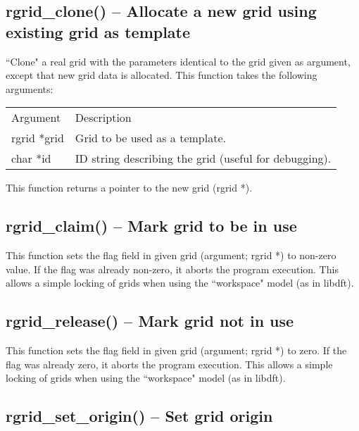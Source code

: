 \documentclass[12pt,letterpaper]{report}
\begin{document}
\subsection{rgrid\_clone() -- Allocate a new grid using existing grid as template}

``Clone" a real grid with the parameters identical to the grid given as argument, except that new grid data is allocated. This function takes the following arguments:
\begin{longtable}{p{} p{}}
Argument & Description\\
\cline{1-2}
rgrid *grid & Grid to be used as a template.\\
char *id & ID string describing the grid (useful for debugging).\\
\end{longtable}
\noindent
This function returns a pointer to the new grid (rgrid *).

\subsection{rgrid\_claim() -- Mark grid to be in use}

This function sets the flag field in given grid (argument; rgrid *) to non-zero value. If the flag was already non-zero, it aborts the program execution. This allows a simple locking of grids when using the ``workspace" model (as in libdft).

\subsection{rgrid\_release() -- Mark grid not in use}

This function sets the flag field in given grid (argument; rgrid *) to zero. If the flag was already zero, it aborts the program execution. This allows a simple locking of grids when using the ``workspace" model (as in libdft).

\subsection{rgrid\_set\_origin() -- Set grid origin}
\end{document}
